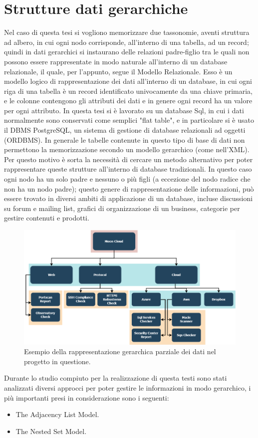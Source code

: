 \section{Strutture dati gerarchiche}
Nel caso di questa tesi si vogliono memorizzare due tassonomie, aventi struttura ad albero, in cui ogni nodo corrisponde, all'interno di una tabella, ad un 
record; quindi in dati gerarchici si instaurano delle relazioni padre-figlio tra le quali non possono essere rappresentate in modo naturale 
all'interno di un database relazionale, il quale, per l'appunto, segue il Modello Relazionale.\hfill\break
Esso è un modello logico di rappresentazione dei dati all'interno di un database, in cui ogni riga di una tabella è un record identificato univocamente
da una chiave primaria, e le colonne contengono gli attributi dei dati e in genere ogni record ha un valore per ogni attributo.\hfill\break
In questa tesi si è lavorato su un database Sql, in cui i dati normalmente sono conservati come semplici "flat table", e in particolare si è usato il DBMS 
PostgreSQL, un sistema di gestione di database relazionali ad oggetti (ORDBMS). In generale le tabelle contenute in questo tipo di base di dati non permettono la 
memorizzazione secondo un modello gerarchico (come nell'XML).\hfill\break
Per questo motivo è sorta la necessità di cercare un metodo alternativo per poter rappresentare queste strutture all'interno di database tradizionali.
In questo caso ogni nodo ha un solo padre e nessuno o più figli (a eccezione del nodo radice che non ha un nodo padre); questo genere di rappresentazione 
delle informazioni, può essere trovato in diversi ambiti di applicazione di un database, incluse discussioni su forum e mailing list, 
grafici di organizzazione di un business, categorie per gestire contenuti e prodotti.
%
\begin{figure}[ht!]
    \centering
    \includegraphics[scale=0.46]{images/MC_Rec_Tree.png}
    \caption{Esempio della rappresentazione gerarchica parziale dei dati nel progetto in questione.}
    \label{fig:MC_Rec_Tree}
\end{figure}
\hfill\break
Durante lo studio compiuto per la realizzazione di questa testi sono stati analizzati diversi approcci per poter gestire le informazioni in modo gerarchico, 
i più importanti presi in considerazione sono i seguenti: 
\begin{itemize}
    \item The Adjacency List Model.
    \item The Nested Set Model.
\end{itemize}
%

